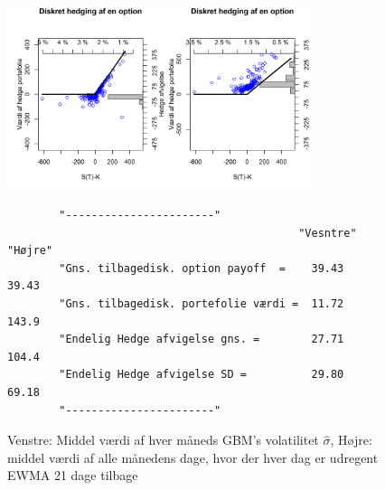 \documentclass{article}
\theoremstyle{definition}
\theoremstyle{remark}
\begin{document}
\begin{figure}
    \centering
    \includegraphics[width=3.5in]{Overleaf/option_call_monthlyGBM_monthlyVIX100EWMA}
    \caption{Venstre: Middel værdi af hver måneds GBM's volatilitet $\hat\sigma$, Højre: middel værdi af alle månedens dage, hvor der hver dag er udregent EWMA 21 dage tilbage}
    \begin{verbatim}
        "-----------------------"                         
                                             "Vesntre"       "Højre"
        "Gns. tilbagedisk. option payoff  =    39.43          39.43
        "Gns. tilbagedisk. portefolie værdi =  11.72          143.9
        "Endelig Hedge afvigelse gns. =        27.71          104.4
        "Endelig Hedge afvigelse SD =          29.80          69.18
        "-----------------------"
    \end{verbatim}
    \label{fig:monthGBM}
\end{figure}
\end{document}
